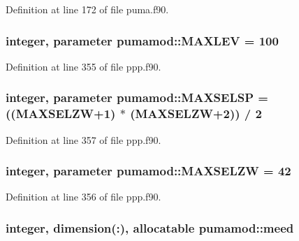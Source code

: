 \-Definition at line 172 of file puma.\-f90.

\hypertarget{classpumamod_a80d5840e4839b80e13a754bc1ad9e5cd}{
\subsubsection[{\-M\-A\-X\-L\-E\-V}]{\setlength{\rightskip}{0pt plus 5cm}integer, parameter {\bf pumamod\-::\-M\-A\-X\-L\-E\-V} = 100}}
\label{classpumamod_a80d5840e4839b80e13a754bc1ad9e5cd}


\-Definition at line 355 of file ppp.\-f90.

\hypertarget{classpumamod_a9d128654f0c25001f195e33b7a28029d}{
\subsubsection[{\-M\-A\-X\-S\-E\-L\-S\-P}]{\setlength{\rightskip}{0pt plus 5cm}integer, parameter {\bf pumamod\-::\-M\-A\-X\-S\-E\-L\-S\-P} = (({\bf \-M\-A\-X\-S\-E\-L\-Z\-W}+1) $\ast$ ({\bf \-M\-A\-X\-S\-E\-L\-Z\-W}+2)) / 2}}
\label{classpumamod_a9d128654f0c25001f195e33b7a28029d}


\-Definition at line 357 of file ppp.\-f90.

\hypertarget{classpumamod_ab32dffe308b27471e38da867575f6811}{
\subsubsection[{\-M\-A\-X\-S\-E\-L\-Z\-W}]{\setlength{\rightskip}{0pt plus 5cm}integer, parameter {\bf pumamod\-::\-M\-A\-X\-S\-E\-L\-Z\-W} = 42}}
\label{classpumamod_ab32dffe308b27471e38da867575f6811}


\-Definition at line 356 of file ppp.\-f90.

\hypertarget{classpumamod_a1909f4521ecd22aa8e00db6e17c10ad9}{
\subsubsection[{meed}]{\setlength{\rightskip}{0pt plus 5cm}integer, dimension(\-:), allocatable {\bf pumamod\-::meed}}}
\label{classpumamod_a1909f4521ecd22aa8e00db6e17c10ad9}


